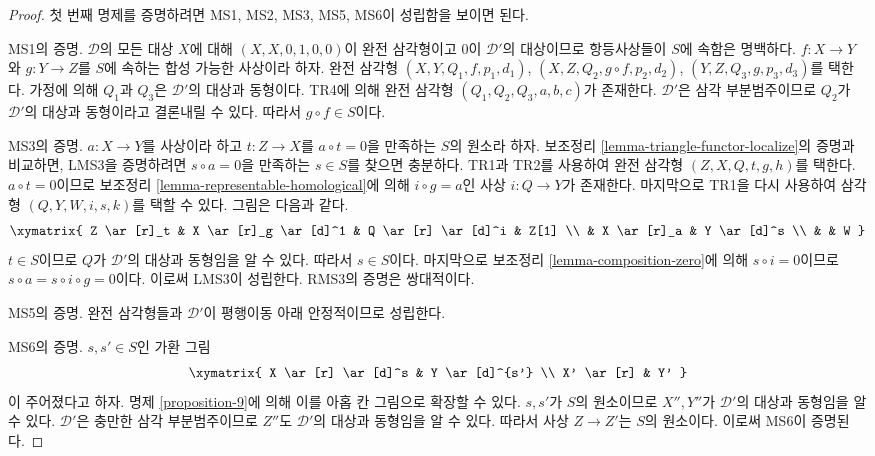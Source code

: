 \begin{proof}
첫 번째 명제를 증명하려면 MS1, MS2, MS3, MS5, MS6이 성립함을
보이면 된다.

\medskip\noindent
MS1의 증명. $\mathcal{D}$의 모든 대상 $X$에 대해
$(X, X, 0, 1, 0, 0)$이 완전 삼각형이고 $0$이 $\mathcal{D}'$의
대상이므로 항등사상들이 $S$에 속함은 명백하다. $f : X \to Y$와
$g : Y \to Z$를 $S$에 속하는 합성 가능한 사상이라 하자.
완전 삼각형 $(X, Y, Q_1, f, p_1, d_1)$,
$(X, Z, Q_2, g \circ f, p_2, d_2)$,
$(Y, Z, Q_3, g, p_3, d_3)$를 택한다. 가정에 의해 $Q_1$과
$Q_3$은 $\mathcal{D}'$의 대상과 동형이다. TR4에 의해 완전 삼각형
$(Q_1, Q_2, Q_3, a, b, c)$가 존재한다. $\mathcal{D}'$은 삼각
부분범주이므로 $Q_2$가 $\mathcal{D}'$의 대상과 동형이라고 결론내릴
수 있다. 따라서 $g \circ f \in S$이다.

\medskip\noindent
MS3의 증명. $a : X \to Y$를 사상이라 하고 $t : Z \to X$를
$a \circ t = 0$을 만족하는 $S$의 원소라 하자. 보조정리
\ref{lemma-triangle-functor-localize}의 증명과 비교하면, LMS3을
증명하려면 $s \circ a = 0$을 만족하는 $s \in S$를 찾으면 충분하다.
TR1과 TR2를 사용하여 완전 삼각형 $(Z, X, Q, t, g, h)$를 택한다.
$a \circ t = 0$이므로 보조정리
\ref{lemma-representable-homological}에 의해
$i \circ g = a$인 사상 $i : Q \to Y$가 존재한다.
마지막으로 TR1을 다시 사용하여 삼각형 $(Q, Y, W, i, s, k)$를
택할 수 있다. 그림은 다음과 같다.
$$
\xymatrix{
Z \ar[r]_t & X \ar[r]_g \ar[d]^1 & Q \ar[r] \ar[d]^i & Z[1] \\
& X \ar[r]_a & Y \ar[d]^s \\
& & W
}
$$
$t \in S$이므로 $Q$가 $\mathcal{D}'$의 대상과 동형임을 알 수 있다.
따라서 $s \in S$이다. 마지막으로 보조정리
\ref{lemma-composition-zero}에 의해 $s \circ i = 0$이므로
$s \circ a = s \circ i \circ g = 0$이다.
이로써 LMS3이 성립한다. RMS3의 증명은 쌍대적이다.

\medskip\noindent
MS5의 증명. 완전 삼각형들과 $\mathcal{D}'$이 평행이동 아래
안정적이므로 성립한다.

\medskip\noindent
MS6의 증명. $s, s' \in S$인 가환 그림
$$
\xymatrix{
X \ar[r] \ar[d]^s &
Y \ar[d]^{s'} \\
X' \ar[r] &
Y'
}
$$
이 주어졌다고 하자. 명제 \ref{proposition-9}에 의해 이를 아홉 칸
그림으로 확장할 수 있다. $s, s'$가 $S$의 원소이므로 $X'', Y''$가
$\mathcal{D}'$의 대상과 동형임을 알 수 있다. $\mathcal{D}'$은
충만한 삼각 부분범주이므로 $Z''$도 $\mathcal{D}'$의 대상과
동형임을 알 수 있다. 따라서 사상 $Z \to Z'$는 $S$의 원소이다.
이로써 MS6이 증명된다.


\end{proof}
